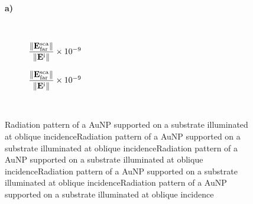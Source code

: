 

\begin{figure}[b!]
    \hspace*{-21em}%
    \vspace*{-1.25em}%
        \begin{subfigure}{.715\textwidth}\caption{ }\label{sfig:IncNormal:1}\end{subfigure}%
        \begin{subfigure}{.25\textwidth}\caption{ }\label{sfig:IncNormal:2}\end{subfigure} \\
    \def\svgwidth{.95\textwidth}
    \small
    \centering
    \vspace*{0em}
    \caption[Absorption and Scattering Efficiencies of a 12.5 nm AuNP above and below a planar Interface Illuminated at Normal Incidence]{\textbf{a)}
    }
\label{fig:IncNormal}
\end{figure}




\begin{figure}[h!]
    \centering
    \def\svgwidth{.8\textwidth}
    \\
        \vspace*{-16.5em}%
        \hspace*{-.2\textwidth}%
    \begin{subfigure}{.4\textwidth}\caption{\footnotesize$\dfrac{\norm{\vb{E}^\text{sca}_\text{far}}}{\norm{\vb{E}^\text{i}}} \times 10^{-9}$  }\label{sfig:Far:IncNorm:a}\end{subfigure}%
    \begin{subfigure}{.4\textwidth}\caption{\footnotesize$\dfrac{\norm{\vb{E}^\text{sca}_\text{far}}}{\norm{\vb{E}^\text{i}}} \times 10^{-9}$  }\label{sfig:Far:IncNorm:b}\end{subfigure}\\[14em]
    \caption[  Radiation pattern of a AuNP supported on a substrate illuminated at oblique incidence ]{Radiation pattern of a AuNP supported on a substrate illuminated at oblique incidenceRadiation pattern of a AuNP supported on a substrate illuminated at oblique incidenceRadiation pattern of a AuNP supported on a substrate illuminated at oblique incidenceRadiation pattern of a AuNP supported on a substrate illuminated at oblique incidenceRadiation pattern of a AuNP supported on a substrate illuminated at oblique incidence    }
    \label{fig:Far:IncNorm}
\end{figure}




